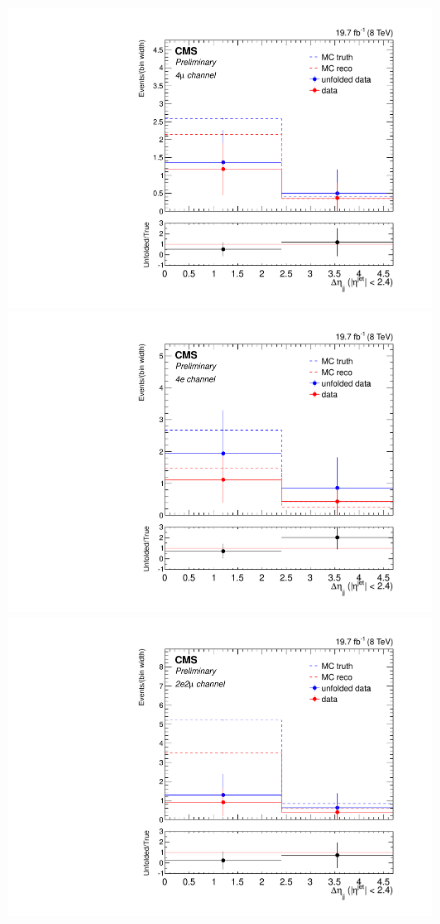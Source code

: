 \begin{figure}[hbtp]
  \begin{center}
    \includegraphics[width=\cmsFigWidth]{Figures/CentralDeta_ZZTo4m_Mad_fr_binwidth}
    \includegraphics[width=\cmsFigWidth]{Figures/CentralDeta_ZZTo4e_Mad_fr_binwidth}
    \includegraphics[width=\cmsFigWidth]{Figures/CentralDeta_ZZTo2e2m_Mad_fr_binwidth}  

\end{center}
\end{figure}
